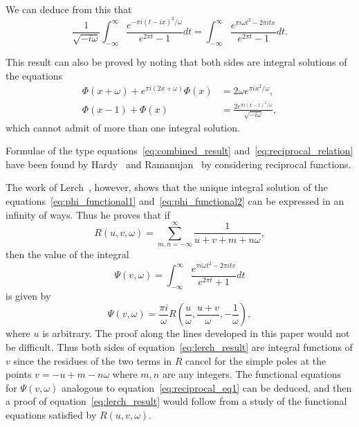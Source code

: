 \documentclass[12pt]{article}
\theoremstyle{remark}
\begin{document}
We can deduce from this that
\begin{equation}\label{eq:reciprocal_relation}
\frac{1}{\sqrt{-i\omega}} \int_{-\infty}^\infty \frac{e^{-\pi i(t-ix)^2/\omega}}{e^{2\pi t} - 1} dt = \int_{-\infty}^\infty \frac{e^{\pi i\omega t^2 - 2\pi itx}}{e^{2\pi t} - 1} dt.
\end{equation}

This result can also be proved by noting that both sides are integral solutions of the equations
\begin{align}
\Phi(x + \omega) + e^{\pi i(2x+\omega)} \Phi(x) &= 2\omega e^{\pi ix^2/\omega}, \label{eq:reciprocal_eq1}\\
\Phi(x - 1) + \Phi(x) &= \frac{2e^{\pi i(x-1)^2/\omega}}{\sqrt{-i\omega}}, \label{eq:reciprocal_eq2}
\end{align}
which cannot admit of more than one integral solution.

Formulae of the type equations~\eqref{eq:combined_result} and~\eqref{eq:reciprocal_relation} have been found by Hardy~\cite{Hardy1904} and Ramanujan~\cite{Ramanujan1915b} by considering reciprocal functions.

The work of Lerch~\cite{Lerch1892}, however, shows that the unique integral solution of the equations~\eqref{eq:phi_functional1} and~\eqref{eq:phi_functional2} can be expressed in an infinity of ways. Thus he proves that if
\begin{equation}\label{eq:lerch_function}
R(u, v, \omega) = \sum_{m,n=-\infty}^\infty \frac{1}{u + v + m + n\omega},
\end{equation}
then the value of the integral
\begin{equation}\label{eq:lerch_integral}
\Psi(v, \omega) = \int_{-\infty}^\infty \frac{e^{\pi i\omega t^2 - 2\pi itv}}{e^{2\pi t} + 1} dt
\end{equation}
is given by
\begin{equation}\label{eq:lerch_result}
\Psi(v, \omega) = \frac{\pi i}{\omega} R\left(\frac{u}{\omega}, \frac{u + v}{\omega}, -\frac{1}{\omega}\right),
\end{equation}
where $u$ is arbitrary. The proof along the lines developed in this paper would not be difficult. Thus both sides of equation~\eqref{eq:lerch_result} are integral functions of $v$ since the residues of the two terms in $R$ cancel for the simple poles at the points $v = -u + m - n\omega$ where $m, n$ are any integers. The functional equations for $\Psi(v, \omega)$ analogous to equation~\eqref{eq:reciprocal_eq1} can be deduced, and then a proof of equation~\eqref{eq:lerch_result} would follow from a study of the functional equations satisfied by $R(u, v, \omega)$.
\end{document}
